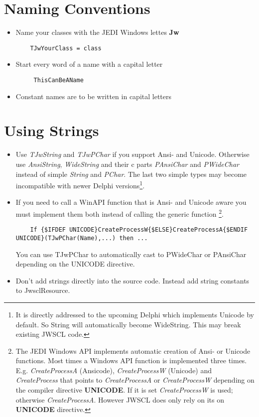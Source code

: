 \documentclass[a4paper,oneside,10pt]{article}
\begin{document}
\section{Naming Conventions}
\begin{itemize}
	\item Name your classes with the JEDI Windows lettes \textbf{Jw} 
	\begin{lstlisting}
	TJwYourClass = class
	\end{lstlisting} 
	\item Start every word of a name with a capital letter 
	\begin{lstlisting}
	 ThisCanBeAName
	\end{lstlisting}
	\item Constant names are to be written in capital letters
\end{itemize}

\section{Using Strings}
\begin{itemize}
	\item Use \textit{TJwString} and \textit{TJwPChar} if you support Ansi- and Unicode. Otherwise use \textit{AnsiString}, \textit{WideString} and their c parts \textit{PAnsiChar} and \textit{PWideChar} instead of simple \textit{String} and \textit{PChar}. The last two simple types may become incompatible with newer Delphi versions\footnote{It is directly addressed to the upcoming Delphi which implements Unicode by default. So String will automatically become WideString. This may break existing JWSCL code.}.
	\item If you need to call a WinAPI function that is Ansi- and Unicode aware you must implement them both instead of calling the generic function \footnote{The JEDI Windows API implements automatic creation of Ansi- or Unicode functions. Most times a Windows API function is implemented three times. E.g. \textit{CreateProcessA} (Ansicode), \textit{CreateProcessW} (Unicode) and \textit{CreateProcess} that points to \textit{CreateProcessA} or \textit{CreateProcessW} depending on the compiler directive \textbf{UNICODE}. If it is set \textit{CreateProcessW} is used; otherwise \textit{CreateProcessA}. However JWSCL does only rely on its on \textbf{UNICODE} directive.}.  
  \begin{lstlisting}
    If {$IFDEF UNICODE}CreateProcessW{$ELSE}CreateProcessA{$ENDIF UNICODE}(TJwPChar(Name),...) then ...
  \end{lstlisting} 
  You can use TJwPChar to automatically cast to PWideChar or PAnsiChar depending on the UNICODE directive.
	\item Don't add strings directly into the source code. Instead add string constants to JwsclResource. 	
\end{itemize}
\end{document}
